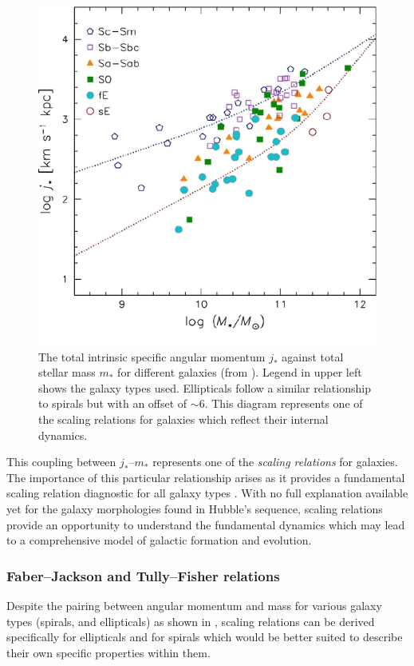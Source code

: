 \documentclass[12pt, twocolumn, nofootinbib]{revtex4-1}    %
\begin{document}
\begin{figure}
\includegraphics[width=1.0\linewidth]{introduction/romanowsky_2012_fig_3}
\caption{The total intrinsic specific angular momentum $j_*$ against total stellar mass $m_*$ for different galaxies (from \citealt{2012ApJS..203...17R}). Legend in upper left shows the galaxy types used. Ellipticals follow a similar relationship to spirals but with an offset of $\sim6$. This diagram represents one of the scaling relations for galaxies which reflect their internal dynamics.}
\label{fig:romanowsky_fall_2012}
\end{figure}

This coupling between $j_*$--$m_*$ represents one of the \textit{scaling relations} for galaxies. The importance of this particular relationship arises as it provides a fundamental scaling relation diagnostic for all galaxy types \citep{2012ApJS..203...17R}. With no full explanation available yet for the galaxy morphologies found in Hubble's sequence, scaling relations provide an opportunity to understand the fundamental dynamics which may lead to a comprehensive model of galactic formation and evolution.

\vspace{2ex} %
\subsubsection{Faber--Jackson and Tully--Fisher relations}
\noindent
Despite the pairing between angular momentum and mass for various galaxy types (spirals, and ellipticals) as shown in \cite{2012ApJS..203...17R}, scaling relations can be derived specifically for ellipticals and for spirals which would be better suited to describe their own specific properties within them.  
\end{document}
